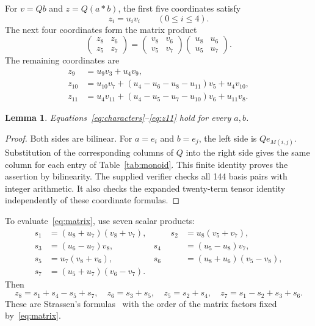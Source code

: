 \documentclass[11pt,a4paper]{article}
\newtheorem{lemma}[theorem]{Lemma}
\begin{document}
For $v=Qb$ and $z=Q(a*b)$, the first five coordinates satisfy
\begin{equation}\label{eq:characters}
 z_i=u_iv_i\qquad(0\leq i\leq4).
\end{equation}
The next four coordinates form the matrix product
\begin{equation}\label{eq:matrix}
 \begin{pmatrix}z_8&z_6\\z_5&z_7\end{pmatrix}
 =\begin{pmatrix}v_8&v_6\\v_5&v_7\end{pmatrix}
  \begin{pmatrix}u_8&u_6\\u_5&u_7\end{pmatrix}.
\end{equation}
The remaining coordinates are
\begin{align}
 z_9&=u_9v_3+u_4v_9,\label{eq:z9}\\
 z_{10}&=u_{10}v_7+(u_4-u_6-u_8-u_{11})v_5+u_4v_{10},\label{eq:z10}\\
 z_{11}&=u_4v_{11}+(u_4-u_5-u_7-u_{10})v_6+u_{11}v_8.\label{eq:z11}
\end{align}

\begin{lemma}\label{lem:coordinates}
Equations~\eqref{eq:characters}--\eqref{eq:z11} hold for every $a,b$.
\end{lemma}
\begin{proof}
Both sides are bilinear. For $a=e_i$ and $b=e_j$, the left side is
$Qe_{M(i,j)}$. Substitution of the corresponding columns of $Q$ into
the right side gives the same column for each entry of
Table~\ref{tab:monoid}. This finite identity proves the assertion by
bilinearity. The supplied verifier checks all 144 basis pairs with
integer arithmetic. It also checks the expanded twenty-term tensor
identity independently of these coordinate formulas.
\end{proof}

To evaluate~\eqref{eq:matrix}, use seven scalar products:
\begin{equation}\label{eq:strassen}
\begin{alignedat}{2}
 s_1&=(u_8+u_7)(v_8+v_7),&\qquad s_2&=u_8(v_5+v_7),\\
 s_3&=(u_6-u_7)v_8,&s_4&=(u_5-u_8)v_7,\\
 s_5&=u_7(v_8+v_6),&s_6&=(u_8+u_6)(v_5-v_8),\\
 s_7&=(u_5+u_7)(v_6-v_7).&&
\end{alignedat}
\end{equation}
Then
\begin{equation}\label{eq:strassenout}
 z_8=s_1+s_4-s_5+s_7,\quad z_6=s_3+s_5,\quad
 z_5=s_2+s_4,\quad z_7=s_1-s_2+s_3+s_6.
\end{equation}
These are Strassen's formulas~\cite{strassen} with the order of the
matrix factors fixed by~\eqref{eq:matrix}.
\end{document}
